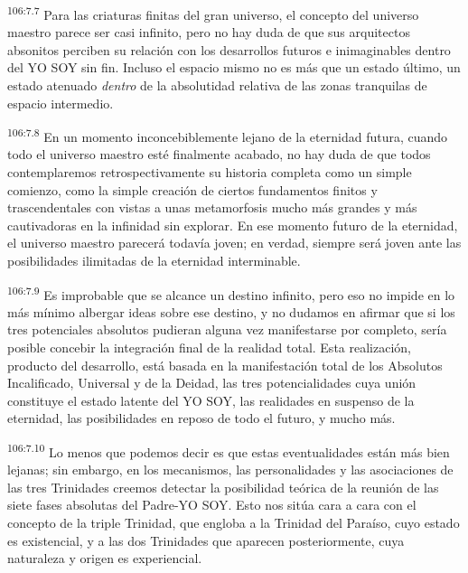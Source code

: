 \documentclass[twoside, 11pt]{book}
\begin{document}
\par
\textsuperscript{106:7.7} Para las criaturas finitas del gran universo, el concepto del universo maestro parece ser casi infinito, pero no hay duda de que sus arquitectos absonitos perciben su relación con los desarrollos futuros e inimaginables dentro del YO SOY sin fin. Incluso el espacio mismo no es más que un estado último, un estado atenuado \textit{dentro} de la absolutidad relativa de las zonas tranquilas de espacio intermedio.

\par
\textsuperscript{106:7.8} En un momento inconcebiblemente lejano de la eternidad futura, cuando todo el universo maestro esté finalmente acabado, no hay duda de que todos contemplaremos retrospectivamente su historia completa como un simple comienzo, como la simple creación de ciertos fundamentos finitos y trascendentales con vistas a unas metamorfosis mucho más grandes y más cautivadoras en la infinidad sin explorar. En ese momento futuro de la eternidad, el universo maestro parecerá todavía joven; en verdad, siempre será joven ante las posibilidades ilimitadas de la eternidad interminable.

\par
\textsuperscript{106:7.9} Es improbable que se alcance un destino infinito, pero eso no impide en lo más mínimo albergar ideas sobre ese destino, y no dudamos en afirmar que si los tres potenciales absolutos pudieran alguna vez manifestarse por completo, sería posible concebir la integración final de la realidad total. Esta realización, producto del desarrollo, está basada en la manifestación total de los Absolutos Incalificado, Universal y de la Deidad, las tres potencialidades cuya unión constituye el estado latente del YO SOY, las realidades en suspenso de la eternidad, las posibilidades en reposo de todo el futuro, y mucho más.

\par
\textsuperscript{106:7.10} Lo menos que podemos decir es que estas eventualidades están más bien lejanas; sin embargo, en los mecanismos, las personalidades y las asociaciones de las tres Trinidades creemos detectar la posibilidad teórica de la reunión de las siete fases absolutas del Padre-YO SOY. Esto nos sitúa cara a cara con el concepto de la triple Trinidad, que engloba a la Trinidad del Paraíso, cuyo estado es existencial, y a las dos Trinidades que aparecen posteriormente, cuya naturaleza y origen es experiencial.
\end{document}
